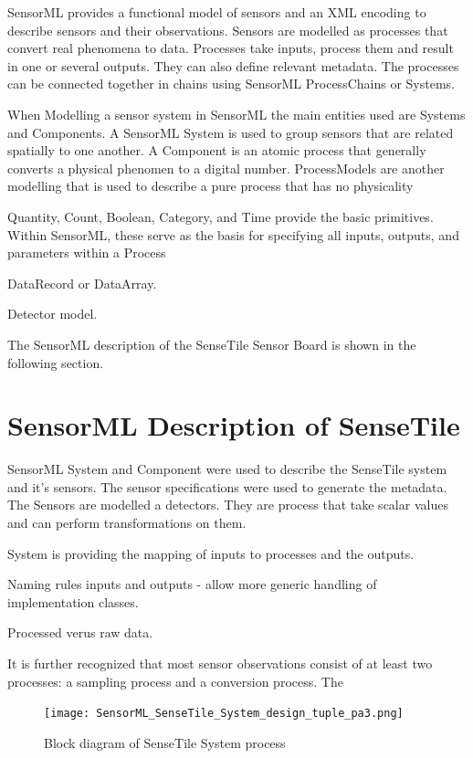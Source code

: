 \documentclass[]{final_report}
\begin{document}
SensorML provides a functional model of sensors and an XML encoding to describe sensors and their observations.
Sensors are modelled as processes that convert real phenomena to data. Processes take inputs, process them and result in one or several outputs. They can also define relevant metadata. The processes can be connected together in chains using SensorML ProcessChains or Systems. 

When Modelling a sensor system in SensorML the main entities used are Systems and Components. A SensorML System is used to group sensors that are related spatially to one another.  A Component is an atomic process that generally converts a physical phenomen to a digital number. ProcessModels are another modelling that is used to describe a pure process that has no physicality

Quantity, Count, Boolean, Category, and Time provide the basic primitives. Within SensorML, these serve as the basis for specifying all inputs, outputs, and parameters within a Process

DataRecord or DataArray.

Detector model.

The SensorML description of the SenseTile Sensor Board is shown in the following section.

\section{SensorML Description of SenseTile}

SensorML System and Component were used to describe the SenseTile system and it's sensors. The sensor specifications were used to generate the metadata.
The Sensors are modelled a detectors. They are process that take scalar values
and can perform transformations on them.

System is providing the mapping of inputs to processes and the outputs.

Naming rules inputs and outputs - allow more generic handling of implementation classes.

Processed verus raw data.

It is further recognized that most sensor observations consist of at least two processes: a sampling process and a conversion process.
The 
 \begin{figure}
\texttt{[image: SensorML\_SenseTile\_System\_design\_tuple\_pa3.png]}
\caption{Block diagram of SenseTile System process}\label{fig:SensorML_SenseTile_design.png}
\end{figure}
\end{document}
